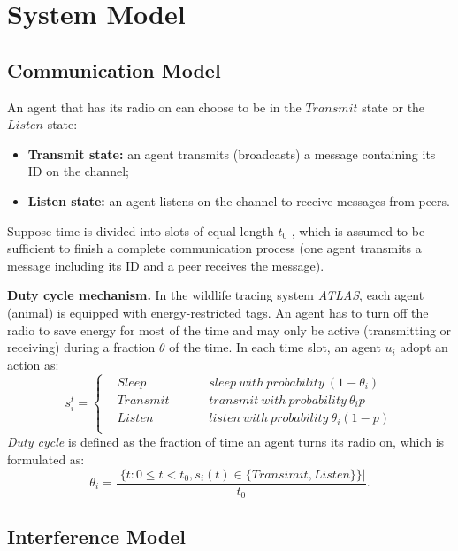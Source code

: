 \section{System Model}
\label{sectionmodel}


\subsection{Communication Model}



An agent that has its radio on can choose to be in the $Transmit$ state
or the $Listen$ state:
\begin{itemize}
\item \textbf{Transmit state:} an agent transmits (broadcasts) 
a message containing its ID on the channel;
\item  \textbf{Listen state:} an agent listens on 
the channel to receive messages from peers.
\end{itemize}

Suppose time is divided into slots of equal length $t_0$
, which is assumed to be sufficient to finish a complete
communication process (one agent transmits a message including its ID and
a peer receives the message).

\textbf{Duty cycle mechanism.} In the wildlife tracing system \emph{ATLAS}, 
each agent (animal) is equipped with energy-restricted tags.
An agent has to turn off the radio to save
energy for most of the time and may only be active 
(transmitting or receiving) during a fraction $\theta$ of the time.
In each time slot, an agent $u_i$ adopt an action as:
$$ s_i^t=\left\{
\begin{aligned}
&Sleep  & & & &{sleep~ with~ probability~ (1-\theta_i)}  	 \\
&Transmit  & & & &{transmit~ with~ probability~ \theta_i p}	\\
&Listen  & & & &{listen~ with~ probability~\theta_i(1-p)}	\\
\end{aligned}
\right.
$$
\emph{Duty cycle} is defined as the fraction of time an agent turns its radio on, 
which is formulated as:
$$\theta_i=\frac{|\{t: 0\leq t<t_0, s_i(t) \in \{Transimit,Listen\}\}|}{t_0}.
$$

\subsection{Interference Model}


